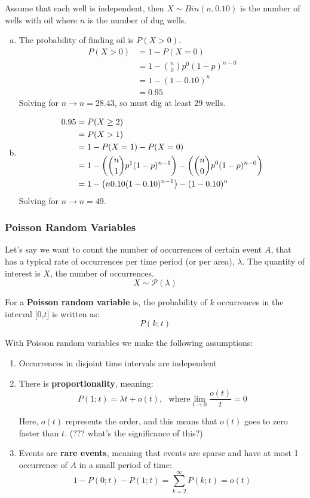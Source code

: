 \documentclass{article}
\DeclarePairedDelimiter\autobracket{(}{)}
\newcommand{\br}[1]{\autobracket*{#1}}
\begin{document}
Assume that each well is independent, then $ X \sim Bin(n, 0.10)$ is the number of wells with oil where $n$ is the number of dug wells.
\begin{enumerate}[(a)]
\item The probability of finding oil is $P(X > 0)$. 
\begin{align*}P(X > 0) & = 1 - P(X = 0) \\
& = 1 - {n \choose 0} p^0 (1-p)^{n-0} \\
& = 1 - (1 - 0.10)^n \\
& = 0.95 
\end{align*}
Solving for $n \rightarrow n = 28.43$, so must dig at least $\boxed{29}$ wells.

\item \begin{align*}
0.95 & = P(X \geq 2) \\
& = P(X > 1) \\
& = 1 - P(X = 1) - P(X = 0) \\
& = 1 - \br{{n \choose 1} p^1 (1-p)^{n-1}} - \br{{n \choose 0} p^0 (1-p)^{n-0}}  \\
& = 1 -  \br{n 0.10 (1-0.10)^{n-1}} - (1-0.10)^{n}
\end{align*}
Solving for $n \rightarrow \boxed{n = 49}$.

\end{enumerate}


\subsubsection{Poisson Random Variables}

Let's say we want to count the number of occurrences of  certain event $A$, that has a typical rate of occurrences per time period (or per area), $\lambda$. The quantity of interest is $X$, the number of occurrences.
$$X \sim \mathcal{P}(\lambda)$$

For a \textbf{Poisson random variable} is, the probability of $k$ occurrences in the interval [0,$t$] is written as: $$P(k; t)$$ 

With Poisson random variables we make the following assumptions: \begin{enumerate}
\item Occurrences in disjoint time intervals are independent
\item There is \textbf{proportionality}, meaning: $$P(1;t) = \lambda t + o(t), \ \ \ \text{where} \lim_{t\rightarrow0} \frac{o(t)}{t} = 0$$

Here, $o(t)$ represents the order, and this means that $o(t)$ goes to zero faster than $t$.  (??? what's the significance of this?)

\item Events are \textbf{rare events}, meaning that events are sparse and have at most 1 occurrence of $A$ in a  small period of time: $$1-P(0;t) - P(1;t) = \sum_{k=2}^{\infty} P(k;t) = o(t)$$
\end{enumerate}
\end{document}
